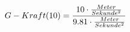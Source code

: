 \documentclass[preview]{standalone}
\begin{document}
\begin{align*}
\special{dvisvgm:raw <g id='unique000'>}G-Kraft(10) = \frac{10 \cdot \frac{Meter}{Sekunde^{2}}}{9.81 \cdot \frac{Meter}{Sekunde^{2}}}\special{dvisvgm:raw </g>}
\end{align*}
\end{document}
